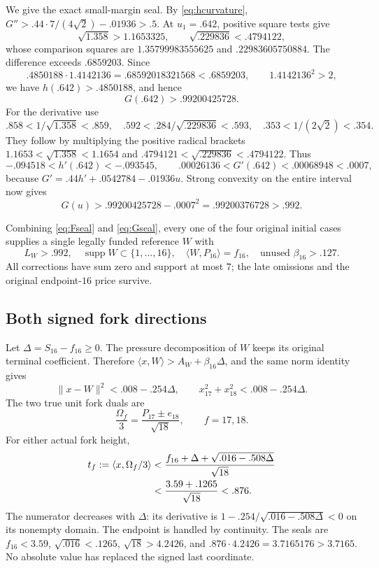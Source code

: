 \documentclass[11pt]{article}
\theoremstyle{definition}
\theoremstyle{remark}
\newcommand{\ip}[2]{\langle #1,#2\rangle}
\newcommand{\norm}[1]{\lVert #1\rVert}
\begin{document}
We give the exact small-margin seal. By \eqref{eq:hcurvature},
\(G''>.44\cdot7/(4\sqrt2)-.01936>.5\).
At \(u_1=.642\), positive square tests give
\[
 \sqrt{1.358}>1.1653325,\qquad
 \sqrt{.229836}<.4794122,
\]
whose comparison squares are \(1.35799983555625\) and
\(.22983605750884\). The difference exceeds \(.6859203\).
Since
\[
 .4850188\cdot1.4142136=.68592018321568<.6859203,
 \qquad1.4142136^2>2,
\]
we have \(h(.642)>.4850188\), and hence
\[
 G(.642)>.99200425728.
\]
For the derivative use
\[
 .858<1/\sqrt{1.358}<.859,\quad
 .592<.284/\sqrt{.229836}<.593,\quad
 .353<1/(2\sqrt2)<.354.
\]
They follow by multiplying the positive radical brackets
\(1.1653<\sqrt{1.358}<1.1654\) and
\(.4794121<\sqrt{.229836}<.4794122\).
Thus
\[
 -.094518<h'(.642)<-.093545,\qquad
 .00026136<G'(.642)<.00068948<.0007,
\]
because \(G'=.44h'+.0542784-.01936u\).
Strong convexity on the entire interval now gives
\begin{equation}
\label{eq:Gseal}
 G(u)>.99200425728-.0007^2
       =.99200376728>.992.
\end{equation}

Combining \eqref{eq:Fseal} and \eqref{eq:Gseal}, every one of
the four original initial cases supplies a single legally
funded reference \(W\) with
\begin{equation}
\label{eq:uniformcontract}
 L_W>.992,\quad
 \operatorname{supp}W\subset\{1,\ldots,16\},\quad
 \ip{W}{P_{16}}=f_{16},\quad
 \text{unused }\beta_{16}>.127.
\end{equation}
All corrections have sum zero and support at most \(7\);
the late omissions and the original endpoint-\(16\) price survive.

\subsection{Both signed fork directions}
\label{subsec:forkheight}
Let \(\Delta=S_{16}-f_{16}\geq0\). The pressure decomposition
of \(W\) keeps its original terminal coefficient. Therefore
\(\ip{x}{W}>A_W+\beta_{16}\Delta\), and the same norm identity
gives
\begin{equation}
\label{eq:slack}
 \norm{x-W}^2<.008-.254\Delta,\qquad
 x_{17}^2+x_{18}^2<.008-.254\Delta.
\end{equation}
The two true unit fork duals are
\[
 \frac{\Omega_f}{3}
   =\frac{P_{17}\pm e_{18}}{\sqrt{18}},
 \qquad f=17,18.
\]
For either actual fork height,
\begin{align}
\label{eq:truefork}
 t_f:=\ip{x}{\Omega_f/3}
 &<\frac{f_{16}+\Delta+\sqrt{.016-.508\Delta}}{\sqrt{18}}\notag\\
 &<\frac{3.59+.1265}{\sqrt{18}}<.876.
\end{align}
The numerator decreases with \(\Delta\): its derivative is
\(1-.254/\sqrt{.016-.508\Delta}<0\) on its nonempty domain.
The endpoint is handled by continuity. The seals are
\(f_{16}<3.59\), \(\sqrt{.016}<.1265\),
\(\sqrt{18}>4.2426\), and
\(.876\cdot4.2426=3.7165176>3.7165\).
No absolute value has replaced the signed last coordinate.
\end{document}
